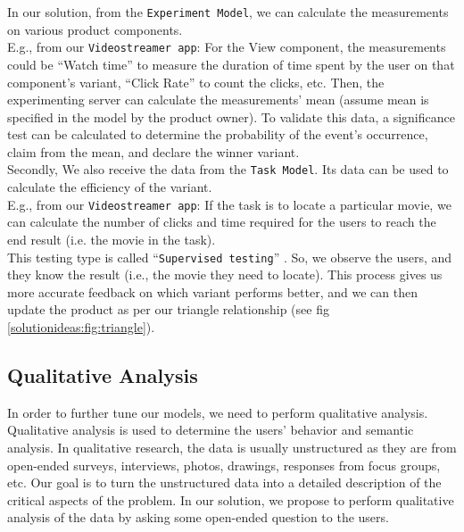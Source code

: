 In our solution, from the \texttt{Experiment Model}, we can calculate the measurements on various product components. \\
E.g., from our \texttt{Videostreamer app}: For the View component, the measurements could be ``Watch time'' to measure the duration of time spent by the user on that component's variant, ``Click Rate'' to count the clicks, etc. Then, the experimenting server can calculate the measurements' mean (assume mean is specified in the model by the product owner). 
To validate this data, a significance test can be calculated to determine the probability of the event's occurrence, claim from the mean, and declare the winner variant. \\
Secondly, We also receive the data from the \texttt{Task Model}. 
Its data can be used to calculate the efficiency of the variant. \\
E.g., from our \texttt{Videostreamer app}: If the task is to locate a particular movie, we can calculate the number of clicks and time required for the users to reach the end result (i.e. the movie in the task). \\
This testing type is called ``\texttt{Supervised testing}'' \cite{article:dataanalysis:supervisedtest}.
So, we observe the users, and they know the result (i.e., the movie they need to locate). 
This process gives us more accurate feedback on which variant performs better, and we can then update the product as per our triangle relationship (see fig \ref{solutionideas:fig:triangle}).  

\subsection{Qualitative Analysis}
\label{solutionideas:section:qualitative}
In order to further tune our models, we need to perform qualitative analysis.
Qualitative analysis is used to determine the users' behavior and semantic analysis. 
In qualitative research, the data is usually unstructured as they are from open-ended surveys, interviews, photos, drawings, responses from focus groups, etc. 
Our goal is to turn the unstructured data into a detailed description of the critical aspects of the problem.
In our solution, we propose to perform qualitative analysis of the data by asking some open-ended question to the users.

